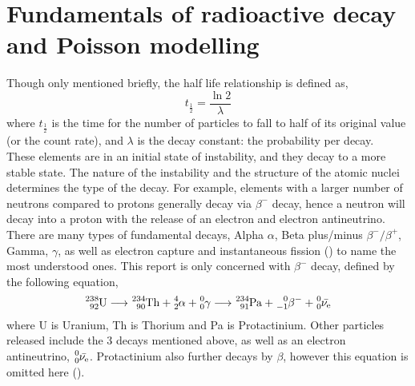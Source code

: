 \documentclass[11pt]{article}
\begin{document}
    \section{Fundamentals of radioactive decay and Poisson modelling}
Though only mentioned briefly, the half life relationship is defined as,
\begin{equation}
        t_{\frac{1}{2}} = \frac{\ln{2}}{\lambda}
    \end{equation}
where $ t_{\frac{1}{2}}$ is the time for the number of particles to fall to half of its original value (or the count rate), and $\lambda$ is the decay constant: the probability per decay. \\
These elements are in an initial state of instability, and they decay to a more stable state. The nature of the instability and the structure of the atomic nuclei determines the type of the decay. For example, elements with a larger number of neutrons compared to protons generally decay via $\beta^{-}$ decay, hence a neutron will decay into a proton with the release of an electron and electron antineutrino. \\
There are many types of fundamental decays, Alpha $\alpha$, Beta plus/minus $\beta^{-}/\beta^{+}$, Gamma, $\gamma$, as well as electron capture and instantaneous fission (\cite{Magill2005}) to name the most understood ones. This report is only concerned with $\beta^{-}$ decay, defined by the following equation,
    \begin{equation}
    \ce{^{238}_{92}U} \longrightarrow \ce{^{234}_{90}Th} + \ce{^{4}_{2}\alpha} + \ce{^{0}_{0}\gamma} \longrightarrow \ce{^{234}_{91}Pa} + \ce{^{0}_{-1}\beta^{-}} + \ce{^{0}_{0}\bar{\nu_{e}}}
\end{equation}
where U is Uranium, Th is Thorium and Pa is Protactinium. Other particles released include the 3 decays mentioned above, as well as an electron antineutrino, $\ce{^{0}_{0}\bar{\nu_{e}}}$. Protactinium also further decays by $\beta$, however this equation is omitted here (\cite{arazo2016uranium}). \\
\end{document}
